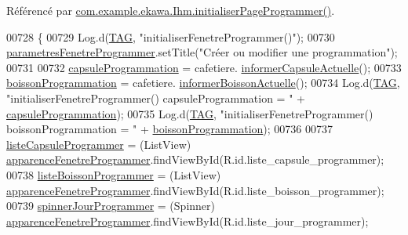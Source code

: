 Référencé par \hyperlink{_ihm_8java_source_l00668}{com.\+example.\+ekawa.\+Ihm.\+initialiser\+Page\+Programmer()}.


\begin{DoxyCode}
00728     \{
00729         Log.d(\hyperlink{classcom_1_1example_1_1ekawa_1_1_ihm_a95cd92c2acaf9f8982302da08d94f9aa}{TAG}, \textcolor{stringliteral}{"initialiserFenetreProgrammer()"});
00730         \hyperlink{classcom_1_1example_1_1ekawa_1_1_ihm_a6eb2afb2fe8da7f3a749089c84934145}{parametresFenetreProgrammer}.setTitle(\textcolor{stringliteral}{"Créer ou modifier une
       programmation"});
00731 
00732         \hyperlink{classcom_1_1example_1_1ekawa_1_1_ihm_a2ddf5b95e2a3fbb3a15d160ba266295a}{capsuleProgrammation} = cafetiere.
      \hyperlink{classcom_1_1example_1_1ekawa_1_1_cafetiere_a3251d1865f3a4113553e1743a971984d}{informerCapsuleActuelle}();
00733         \hyperlink{classcom_1_1example_1_1ekawa_1_1_ihm_a6ad8136ec35fff9e96476c4f35726fea}{boissonProgrammation} = cafetiere.
      \hyperlink{classcom_1_1example_1_1ekawa_1_1_cafetiere_aa7022512d5a36d2b911722ae6400379f}{informerBoissonActuelle}();
00734         Log.d(\hyperlink{classcom_1_1example_1_1ekawa_1_1_ihm_a95cd92c2acaf9f8982302da08d94f9aa}{TAG}, \textcolor{stringliteral}{"initialiserFenetreProgrammer() capsuleProgrammation = "} + 
      \hyperlink{classcom_1_1example_1_1ekawa_1_1_ihm_a2ddf5b95e2a3fbb3a15d160ba266295a}{capsuleProgrammation});
00735         Log.d(\hyperlink{classcom_1_1example_1_1ekawa_1_1_ihm_a95cd92c2acaf9f8982302da08d94f9aa}{TAG}, \textcolor{stringliteral}{"initialiserFenetreProgrammer() boissonProgrammation = "} + 
      \hyperlink{classcom_1_1example_1_1ekawa_1_1_ihm_a6ad8136ec35fff9e96476c4f35726fea}{boissonProgrammation});
00736 
00737         \hyperlink{classcom_1_1example_1_1ekawa_1_1_ihm_adfeb58df0ce9fa2088a7a708a54ffe07}{listeCapsuleProgrammer} = (ListView) 
      \hyperlink{classcom_1_1example_1_1ekawa_1_1_ihm_aa8beb9a05b4f2c2030b9829642f87d3f}{apparenceFenetreProgrammer}.findViewById(R.id.liste\_capsule\_programmer);
00738         \hyperlink{classcom_1_1example_1_1ekawa_1_1_ihm_a8badf9f0485d205f8a379e54b01deab7}{listeBoissonProgrammer} = (ListView) 
      \hyperlink{classcom_1_1example_1_1ekawa_1_1_ihm_aa8beb9a05b4f2c2030b9829642f87d3f}{apparenceFenetreProgrammer}.findViewById(R.id.liste\_boisson\_programmer);
00739         \hyperlink{classcom_1_1example_1_1ekawa_1_1_ihm_a49e6261929f259b2fcc81bf13d21ad7f}{spinnerJourProgrammer} = (Spinner) 
      \hyperlink{classcom_1_1example_1_1ekawa_1_1_ihm_aa8beb9a05b4f2c2030b9829642f87d3f}{apparenceFenetreProgrammer}.findViewById(R.id.liste\_jour\_programmer);

\end{DoxyCode}
